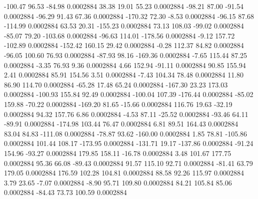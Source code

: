      -100.47       96.53      -84.98     0.0002884
       38.38       19.01       55.23     0.0002884
      -98.21       87.00      -91.54     0.0002884
      -96.29       91.43       67.36     0.0002884
     -170.32       72.30       -8.53     0.0002884
      -96.15       87.68     -114.99     0.0002884
       63.53       20.31     -155.23     0.0002884
       73.13      108.03      -99.02     0.0002884
      -85.07       79.20     -103.68     0.0002884
      -96.63      114.01     -178.56     0.0002884
       -9.12      157.72     -102.89     0.0002884
     -152.42      160.15       29.42     0.0002884
       -0.28      112.37       84.82     0.0002884
      -96.05      100.60       76.93     0.0002884
      -87.93       98.16     -169.36     0.0002884
       -7.65      115.44       87.25     0.0002884
       -3.35       76.93        9.36     0.0002884
        4.66      152.94      -91.11     0.0002884
       90.85      155.94        2.41     0.0002884
       85.91      154.56        3.51     0.0002884
       -7.43      104.34       78.48     0.0002884
       11.80       86.90      114.70     0.0002884
      -65.28       17.48       65.24     0.0002884
     -167.30       23.23      173.03     0.0002884
     -100.93      155.84       92.49     0.0002884
     -100.04      107.39     -176.44     0.0002884
      -85.02      159.88      -70.22     0.0002884
     -169.20       81.65      -15.66     0.0002884
      116.76       19.63      -32.19     0.0002884
       94.32      157.76        6.86     0.0002884
       -4.53       87.11      -25.52     0.0002884
      -93.46       64.11      -89.91     0.0002884
     -174.98      103.44       76.47     0.0002884
        6.81       89.51      164.43     0.0002884
       83.04       84.83     -111.08     0.0002884
      -78.87       93.62     -160.00     0.0002884
        1.85       78.81     -105.86     0.0002884
      101.44      108.17     -173.95     0.0002884
     -131.71       19.17     -137.86     0.0002884
      -91.24      154.96      -93.27     0.0002884
      179.85      158.11      -16.78     0.0002884
        3.48      101.67      177.75     0.0002884
       95.36       66.08      -89.43     0.0002884
       91.57      115.10       92.71     0.0002884
      -81.41       63.79      179.05     0.0002884
      176.59      102.28      104.81     0.0002884
       88.58       92.26      115.97     0.0002884
        3.79       23.65       -7.07     0.0002884
       -8.90       95.71      109.80     0.0002884
       84.21      105.84       85.06     0.0002884
      -84.43       73.73      100.59     0.0002884
